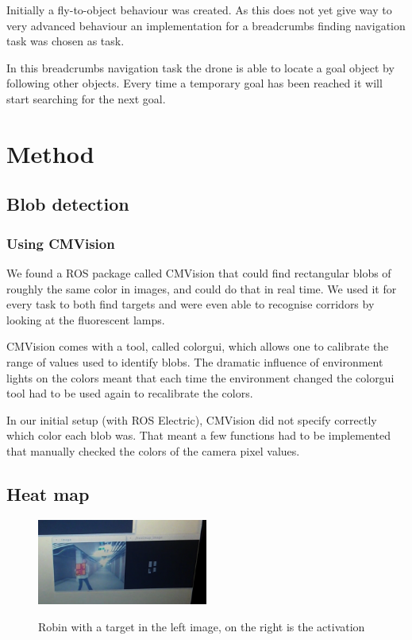 \documentclass[a4paper,10pt]{article}
\begin{document}
Initially a fly-to-object behaviour was created. As this does not yet give way to very advanced behaviour an implementation for a breadcrumbs finding navigation task was chosen as task. 

In this breadcrumbs navigation task the drone is able to locate a goal object by following other objects. 
Every time a temporary goal has been reached it will start searching for the next goal. 
\section{Method}
\subsection{Blob detection}
\label{sec:blobdetection}
\subsubsection{Using CMVision}
We found a ROS package called CMVision that could find rectangular blobs of
roughly the same color in images, and could do that in real time. We used
it for every task to both find targets and were even able to recognise corridors by looking at the fluorescent lamps. 

CMVision comes with a tool, called colorgui, which allows one to calibrate the
range of values used to identify blobs. The dramatic influence of environment
lights on the colors meant that each time the environment changed the colorgui tool had to be used again to recalibrate the colors.

In our initial setup (with ROS Electric), CMVision did not specify correctly
which color each blob was. That meant a few functions had to be implemented that manually checked the colors of the camera pixel values.


\subsection{Heat map}

\begin{figure}[h!]
	\caption{Robin with a target in the left image, on the right is the activation}
	\centering
	\includegraphics[width=0.5\textwidth]{images/robinPresentActivation}
	\label{fig:robinPresentActivation}
\end{figure}
\end{document}

